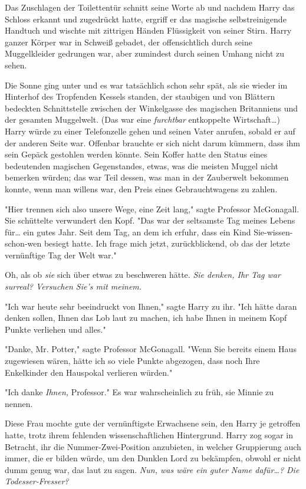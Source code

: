 {Das Zuschlagen der Toilettentür schnitt seine Worte ab und nachdem Harry das Schloss erkannt und zugedrückt hatte, ergriff er das magische selbstreinigende Handtuch und wischte mit zittrigen Händen Flüssigkeit von seiner Stirn. Harry ganzer Körper war in Schweiß gebadet, der offensichtlich durch seine Muggelkleider gedrungen war, aber zumindest durch seinen Umhang nicht zu sehen.

Die Sonne ging unter und es war tatsächlich schon sehr spät, als sie wieder im Hinterhof des Tropfenden Kessels standen, der staubigen und von Blättern bedeckten Schnittstelle zwischen der Winkelgasse des magischen Britanniens und der gesamten Muggelwelt. (Das war eine \emph{furchtbar} entkoppelte Wirtschaft…) Harry würde zu einer Telefonzelle gehen und seinen Vater anrufen, sobald er auf der anderen Seite war. Offenbar brauchte er sich nicht darum kümmern, dass ihm sein Gepäck gestohlen werden könnte. Sein Koffer hatte den Status eines bedeutenden magischen Gegenstandes, etwas, was die meisten Muggel nicht bemerken würden; das war Teil dessen, was man in der Zauberwelt bekommen konnte, wenn man willens war, den Preis eines Gebrauchtwagens zu zahlen.

"Hier trennen sich also unsere Wege, eine Zeit lang," sagte Professor McGonagall. Sie schüttelte verwundert den Kopf. "Das war der seltsamste Tag meines Lebens für… ein gutes Jahr. Seit dem Tag, an dem ich erfuhr, dass ein Kind Sie-wissen-schon-wen besiegt hatte. Ich frage mich jetzt, zurückblickend, ob das der letzte vernünftige Tag der Welt war."

Oh, als ob \emph{sie} sich über etwas zu beschweren hätte. \emph{Sie denken, Ihr Tag war surreal? Versuchen Sie's mit meinem.}

"Ich war heute sehr beeindruckt von Ihnen," sagte Harry zu ihr. "Ich hätte daran denken sollen, Ihnen das Lob laut zu machen, ich habe Ihnen in meinem Kopf Punkte verliehen und alles."

"Danke, Mr. Potter," sagte Professor McGonagall. "Wenn Sie bereits einem Haus zugewiesen wären, hätte ich so viele Punkte abgezogen, dass noch Ihre Enkelkinder den Hauspokal verlieren würden."

"Ich danke \emph{Ihnen,} Professor." Es war wahrscheinlich zu früh, sie Minnie zu nennen.

Diese Frau mochte gute der vernünftigste Erwachsene sein, den Harry je getroffen hatte, trotz ihrem fehlenden wissenschaftlichen Hintergrund. Harry zog sogar in Betracht, ihr die Nummer-Zwei-Position anzubieten, in welcher Gruppierung auch immer, die er bilden würde, um den Dunklen Lord zu bekämpfen, obwohl er nicht dumm genug war, das laut zu sagen. \emph{Nun, was wäre ein guter Name dafür…? Die Todesser-Fresser?}

}
